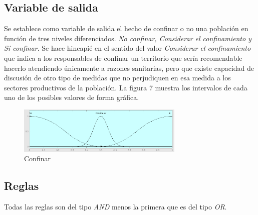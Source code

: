 \documentclass[12pt,a4paper, xcolor=table]{article}
\begin{document}
\subsection{Variable de salida}

Se establece como variable de salida el hecho de confinar o no una población en función de tres niveles diferenciados. \textit{No confinar, Considerar el confinamiento y Sí confinar}. Se hace hincapié en el sentido del valor \textit{Considerar el confinamiento} que indica a los responsables de confinar un territorio que sería recomendable hacerlo atendiendo únicamente a razones sanitarias, pero que existe capacidad de discusión de otro tipo de medidas que no perjudiquen en esa medida a los sectores productivos de la población.  La figura 7 muestra los intervalos de cada uno de los posibles valores de forma gráfica.

\begin{figure}[!h]
  \centering
  \includegraphics[width=300px]{img/confinar.png}
  \caption{Confinar}
\end{figure}

\subsection{Reglas}

Todas las reglas son del tipo \textit{AND} menos la primera que es del tipo \textit{OR}.
\end{document}
